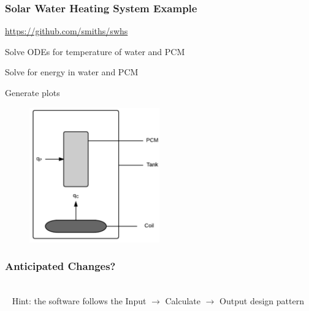 \documentclass[t, 12pt, numbers, fleqn, handout]{beamer}
\begin{document}
\begin{frame}
\frametitle{Solar Water Heating System Example}

\bi
\item \href{https://github.com/smiths/swhs}{https://github.com/smiths/swhs}
\item Solve ODEs for temperature of water and PCM
\item Solve for energy in water and PCM
\item Generate plots
\ei

\begin{figure}
{
\includegraphics[width=0.5\textwidth]{../Figures/Tank.pdf}
}
\end{figure}

\end{frame}


\begin{frame}
\frametitle{Anticipated Changes?}

\\
~\newline
Hint: the software follows the Input $\rightarrow$ Calculate $\rightarrow$
Output design pattern

\end{frame}

\end{document}
